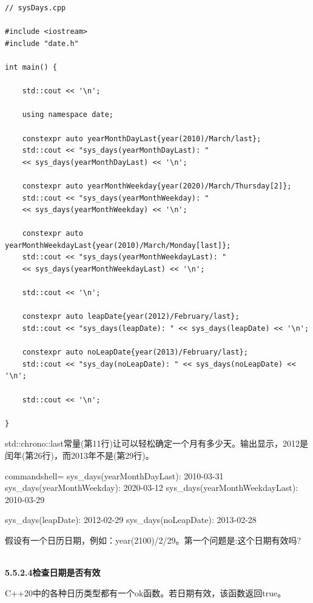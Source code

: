 \begin{lstlisting}[style=styleCXX]
// sysDays.cpp

#include <iostream>
#include "date.h"

int main() {

	std::cout << '\n';
	
	using namespace date;
	
	constexpr auto yearMonthDayLast{year(2010)/March/last};
	std::cout << "sys_days(yearMonthDayLast): "
	<< sys_days(yearMonthDayLast) << '\n';
	
	constexpr auto yearMonthWeekday{year(2020)/March/Thursday[2]};
	std::cout << "sys_days(yearMonthWeekday): "
	<< sys_days(yearMonthWeekday) << '\n';
	
	constexpr auto yearMonthWeekdayLast{year(2010)/March/Monday[last]};
	std::cout << "sys_days(yearMonthWeekdayLast): "
	<< sys_days(yearMonthWeekdayLast) << '\n';
	
	std::cout << '\n';
	
	constexpr auto leapDate{year(2012)/February/last};
	std::cout << "sys_days(leapDate): " << sys_days(leapDate) << '\n';
	
	constexpr auto noLeapDate{year(2013)/February/last};
	std::cout << "sys_day(noLeapDate): " << sys_days(noLeapDate) << '\n';
	
	std::cout << '\n';

}
\end{lstlisting}

std::chrono::last常量(第11行)让可以轻松确定一个月有多少天。输出显示，2012是闰年(第26行)，而2013年不是(第29行)。

\begin{tcblisting}{commandshell={}}
sys_days(yearMonthDayLast): 2010-03-31
sys_days(yearMonthWeekday): 2020-03-12
sys_days(yearMonthWeekdayLast): 2010-03-29

sys_days(leapDate): 2012-02-29
sys_days(noLeapDate): 2013-02-28
\end{tcblisting}

假设有一个日历日期，例如：year(2100)/2/29。第一个问题是:这个日期有效吗?

\hspace*{\fill} \\ %
\noindent
\textbf{5.5.2.4\hspace{0.2cm}检查日期是否有效}

C++20中的各种日历类型都有一个ok函数。若日期有效，该函数返回true。

